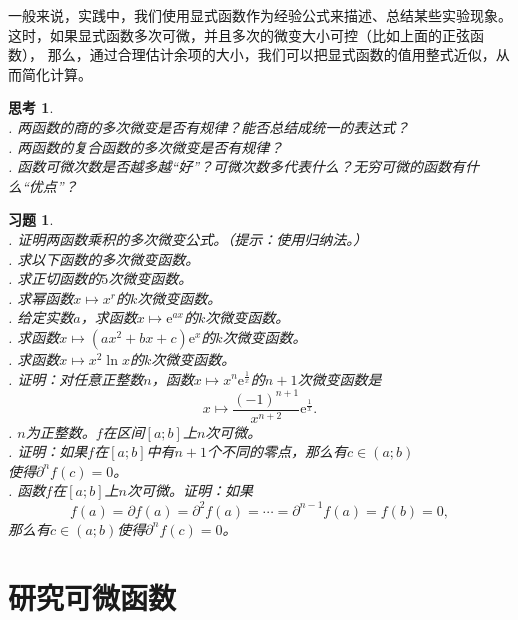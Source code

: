 \documentclass[12pt,UTF8]{ctexbook}
\theoremstyle{definition}
\theoremstyle{plain}
\newtheorem{sk}{思考}[section]
\newtheorem{xt}{习题}[section]
\begin{document}
一般来说，实践中，我们使用显式函数作为经验公式来描述、总结某些实验现象。
这时，如果显式函数多次可微，并且多次的微变大小可控（比如上面的正弦函数），
那么，通过合理估计余项的大小，我们可以把显式函数的值用整式近似，从而简化计算。

\begin{sk}
    \mbox{} \\
    . 两函数的商的多次微变是否有规律？能否总结成统一的表达式？\\
    . 两函数的复合函数的多次微变是否有规律？\\
    . 函数可微次数是否越多越“好”？可微次数多代表什么？无穷可微的函数有什么“优点”？
\end{sk}

\begin{xt}
    \mbox{} \\
    . 证明两函数乘积的多次微变公式。（提示：使用归纳法。）\\
    . 求以下函数的多次微变函数。\\
    . 求正切函数的$5$次微变函数。\\
    . 求幂函数$x\mapsto x^r$的$k$次微变函数。\\
    . 给定实数$a$，求函数$x\mapsto \mathrm{e}^{ax}$的$k$次微变函数。\\
    . 求函数$x \mapsto (ax^2 + bx + c)\mathrm{e}^x$的$k$次微变函数。\\
    . 求函数$x \mapsto x^2\ln{x}$的$k$次微变函数。\\
    . 证明：对任意正整数$n$，函数$x\mapsto x^n \mathrm{e}^{\frac{1}{x}}$的$n+1$次微变函数是
    $$x\mapsto \frac{(-1)^{n+1}}{x^{n+2}}\mathrm{e}^{\frac{1}{x}}.$$
    . $n$为正整数。$f$在区间$[a; b]$上$n$次可微。\\
    . 证明：如果$f$在$[a; b]$中有$n+1$个不同的零点，那么有$c\in(a; b)$\\
    \indent 使得$\partial^n f(c) = 0$。\\
    . 函数$f$在$[a; b]$上$n$次可微。证明：如果
    $$f(a) = \partial f(a) = \partial^2 f(a) = \cdots = \partial^{n-1} f(a) = f(b) = 0,$$
    \indent 那么有$c\in(a; b)$使得$\partial^n f(c) = 0$。\\
\end{xt}

\chapter{研究可微函数}
\end{document}
